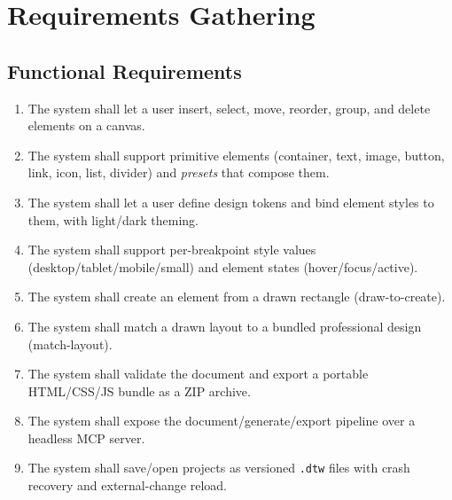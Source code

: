 
\chapter{Requirements Gathering}
\label{ch:requirements}

\section{Functional Requirements}
\begin{enumerate}[label=\textbf{FR\arabic*.}, leftmargin=3.4em]
  \item The system shall let a user insert, select, move, reorder, group, and
        delete elements on a canvas.
  \item The system shall support primitive elements (container, text, image,
        button, link, icon, list, divider) and \emph{presets} that compose them.
  \item The system shall let a user define design tokens and bind element styles
        to them, with light/dark theming.
  \item The system shall support per-breakpoint style values
        (desktop/tablet/mobile/small) and element states (hover/focus/active).
  \item The system shall create an element from a drawn rectangle (draw-to-create).
  \item The system shall match a drawn layout to a bundled professional design
        (match-layout).
  \item The system shall validate the document and export a portable HTML/CSS/JS
        bundle as a ZIP archive.
  \item The system shall expose the document/generate/export pipeline over a
        headless MCP server.
  \item The system shall save/open projects as versioned \texttt{.dtw} files with
        crash recovery and external-change reload.
\end{enumerate}

